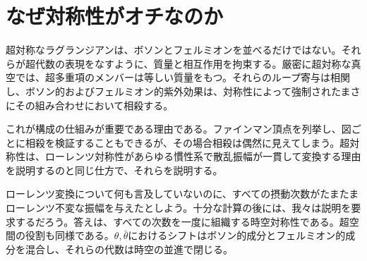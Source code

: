 \section{なぜ対称性がオチなのか}

超対称なラグランジアンは、ボソンとフェルミオンを並べるだけではない。それらが超代数の表現をなすように、質量と相互作用を拘束する。厳密に超対称な真空では、超多重項のメンバーは等しい質量をもつ。それらのループ寄与は相関し、ボソン的およびフェルミオン的紫外効果は、対称性によって強制されたまさにその組み合わせにおいて相殺する。

これが構成の仕組みが重要である理由である。ファインマン頂点を列挙し、図ごとに相殺を検証することもできるが、その場合相殺は偶然に見えてしまう。超対称性は、ローレンツ対称性があらゆる慣性系で散乱振幅が一貫して変換する理由を説明するのと同じ仕方で、それらを説明する。


\begin{classroomqa}
\end{classroomqa}

\begin{classroomqa}
\end{classroomqa}

ローレンツ変換について何も言及していないのに、すべての摂動次数がたまたまローレンツ不変な振幅を与えたとしよう。十分な計算の後には、我々は説明を要求するだろう。答えは、すべての次数を一度に組織する時空対称性である。超空間の役割も同様である。\(\theta,\bar\theta\)におけるシフトはボソン的成分とフェルミオン的成分を混合し、それらの代数は時空の並進で閉じる。

